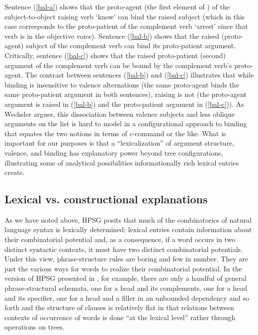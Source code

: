 \documentclass[output=paper]{langsci/langscibook}
\begin{document}
Sentence (\ref{bal-a}) shows that the proto-agent (the first element of ) of the subject-to-object raising verb  `know' can bind the raised subject (which in this case corresponds to the proto-patient of the complement verb  `arrest' since that verb is in the objective voice). Sentence (\ref{bal-b}) shows that the raised (proto-agent) subject of the complement verb can bind its proto-patient argument. Critically, sentence (\ref{bal-c}) shows that the raised proto-patient (second) argument of the complement verb can be bound by the complement verb's proto-agent. The contrast between sentences (\ref{bal-b}) and (\ref{bal-c}) illustrates that while binding is insensitive to valence alternations (the same proto-agent binds the same proto-patient argument in both sentences), raising is not (the proto-agent argument is raised in (\ref{bal-b}) and the proto-patient argument in (\ref{bal-c})). As Wechsler argues, this dissociation between valence subjects and less oblique arguments on the  list is hard to model in a configurational approach to binding that equates the two notions in terms of c-command or the like. What is important for our purposes is that a ``lexicalization'' of argument structure, valence, and binding has explanatory power beyond tree configurations, illustrating some of analytical possibilities informationally rich lexical entries create. 

\subsection{Lexical vs. constructional explanations}


As we have noted above, HPSG posits that much of the combinatorics of natural language syntax is lexically determined; lexical entries contain information about their combinatorial potential and, as a consequence, if a word occurs in two distinct syntactic contexts, it must have two distinct combinatorial potentials. Under this view, phrase-structure rules are boring and few in number. They are just the various ways for words to realize their combinatorial potential. In the version of HPSG presented in , for example, there are only a handful of general phrase-structural schemata, one for a head and its complements, one for a head and its specifier, one for a head and a filler in an unbounded dependency and so forth and the structure of clauses is relatively flat in that relations between contexts of occurrence of words is done ``at the lexical level'' rather through operations on trees. 
\end{document}
